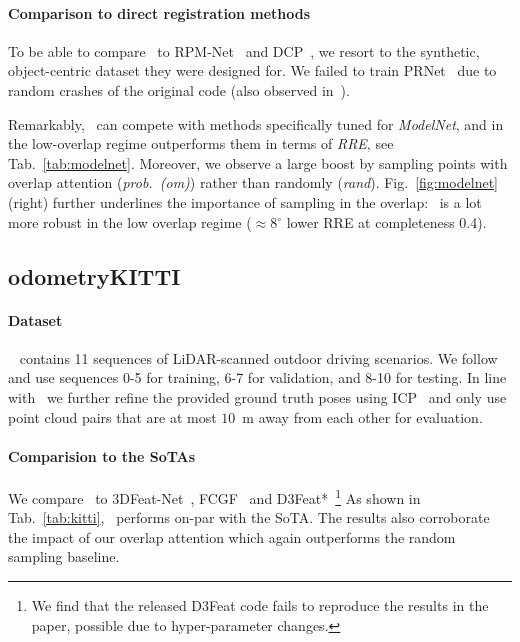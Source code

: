 
\paragraph{Comparison to direct registration methods}
To be able to compare \acro\ to RPM-Net~\cite{yew2020rpm} and DCP~\cite{wang2019dcp}, we resort to the synthetic, object-centric dataset they were designed for. We failed to train PRNet~\cite{wang2019prnet} due to random crashes of the original code (also observed in~\cite{choy2020deep}).

Remarkably, \acro\ can compete with methods specifically tuned for \emph{ModelNet}, and in the low-overlap regime outperforms them in terms of \emph{RRE}, see Tab.~\ref{tab:modelnet}.
Moreover, we observe a large boost by sampling points with overlap attention (\emph{prob.\ (om)}) rather than randomly (\emph{rand}).
Fig.~\ref{fig:modelnet} (right) further underlines the importance of sampling in the overlap: \acro\ is a lot more robust in the low overlap regime ($\approx$8$^\circ$ lower RRE at completeness 0.4). 

\subsection{odometryKITTI}
\label{sec:kitti}
\paragraph{Dataset}
~\cite{geiger2012kitti} contains 11 sequences of LiDAR-scanned outdoor driving scenarios. We follow ~\cite{Choy2019FCGF} and use sequences 0-5 for training, 6-7 for validation, and 8-10 for testing. In line with~\cite{Choy2019FCGF, bai2020d3feat} we further refine the provided ground truth poses using ICP~\cite{besl1992method} and only use point cloud pairs that are at most $10$~m away from each other for evaluation.

\paragraph{Comparision to the SoTAs} 

We compare \acro\ to 3DFeat-Net~\cite{yew20183dfeat}, FCGF~\cite{Choy2019FCGF} and D3Feat*~\cite{bai2020d3feat}\footnote{We find that the released D3Feat code fails to reproduce the results in the paper, possible due to hyper-parameter changes.}
As shown in Tab.~\ref{tab:kitti}, \acro\ performs on-par with the SoTA. The results also corroborate the impact of our overlap attention %
which again outperforms the random sampling baseline.

